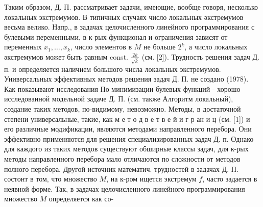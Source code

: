 \documentclass[10pt]{article}
\begin{document}
Таким образом, Д. П. рассматривает задачи, имеющие, вообще говоря, несколько локальных экстремумов. В типичных случаях число локальных әкстремумов весьма велико. Напр., в задачах целочисленного линейного программирования с булевыми переменными, в к-рых функционал и ограничения зависят от переменных $x_{1}, \ldots, x_{k}$, число элементов в $M$ не больше $2^{k}$, а число локальных әкстремумов может быть равным const. $\frac{2 k}{\sqrt{k}}$ (см. [2]). Трудность решения задач Д. п. и определяется наличием большого числа локальных экстремумов. Универсальных эффективных методов решения задач Д. П. не создано (1978). Как показывают исследования По минимизации булевых функций - хорошо исследованной модельной задаче Д. П. (см. также Алгоритм локальный), создание таких методов, по-видимому, невозможно. Методы, в достаточной степени универсальные, такие, как м е т о д в е т в е й и г р ан и ц (см. [1]) и его различные модификации, являются методами направленного перебора. Они эффективно применяются для решения специализированных задач Д. п. Однако для каждого из таких методов существуют обширные классы задач, для к-рых методы направленного перебора мало отличаются по сложности от методов полного перебора. Другой источник математич. трудностей в задачах Д. П. состонт в том, что множество $M$, на к-ром ищется экстремум $f$, часто задается в неявной форме. Так, в задачах целочисленного линейного программирования множество $M$ определяется как со-
\end{document}

